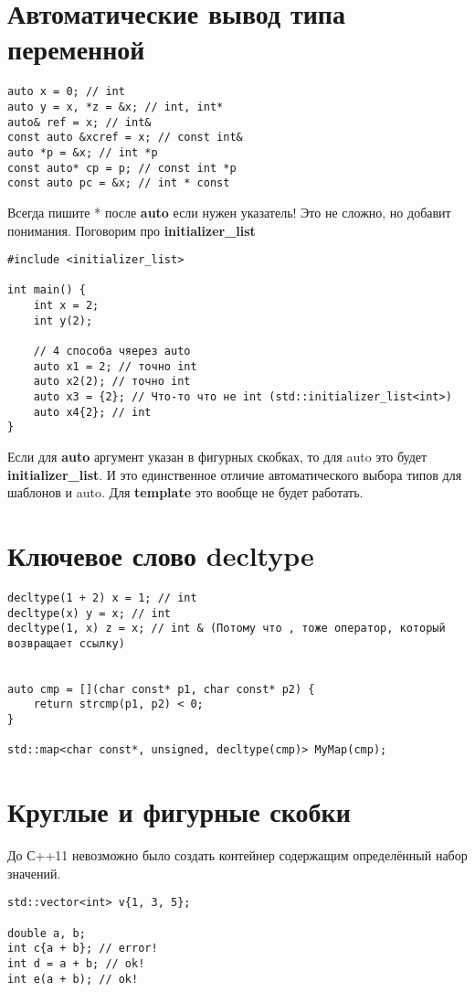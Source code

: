 \documentclass[a4paper, 12pt, titlepage, finall]{extreport}
\begin{document}
        \section{Автоматические вывод типа переменной}
\begin{lstlisting}
auto x = 0; // int
auto y = x, *z = &x; // int, int*
auto& ref = x; // int&
const auto &xcref = x; // const int&
auto *p = &x; // int *p
const auto* cp = p; // const int *p
const auto pc = &x; // int * const
\end{lstlisting}
            Всегда пишите * после {\bf auto} если нужен указатель! Это не сложно, но добавит понимания.
            Поговорим про {\bf initializer\_list}
\begin{lstlisting}
#include <initializer_list>

int main() {
    int x = 2;
    int y(2);

    // 4 способа чяерез auto
    auto x1 = 2; // точно int
    auto x2(2); // точно int
    auto x3 = {2}; // Что-то что не int (std::initializer_list<int>)
    auto x4{2}; // int
}
\end{lstlisting}
            Если для {\bf auto} аргумент указан в фигурных скобках, то для auto это будет {\bf initializer\_list}. 
            И это единственное отличие автоматического выбора типов для шаблонов и auto.
            Для {\bf template} это вообще не будет работать.
        \section{Ключевое слово decltype}
\begin{lstlisting}
decltype(1 + 2) x = 1; // int
decltype(x) y = x; // int
decltype(1, x) z = x; // int & (Потому что , тоже оператор, который возвращает ссылку)


auto cmp = [](char const* p1, char const* p2) {
    return strcmp(p1, p2) < 0;
}

std::map<char const*, unsigned, decltype(cmp)> MyMap(cmp);
\end{lstlisting}
        \section{Круглые и фигурные скобки}
        До С++11 невозможно было создать контейнер содержащим определённый набор значений.
\begin{lstlisting}
std::vector<int> v{1, 3, 5};

double a, b;
int c{a + b}; // error!
int d = a + b; // ok!
int e(a + b); // ok!

\end{lstlisting}
\end{document}
